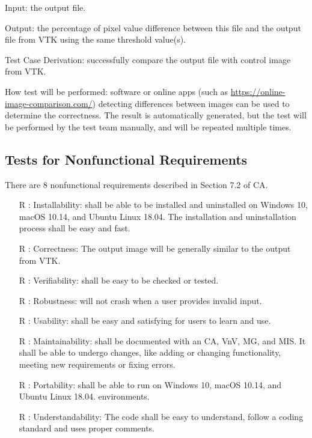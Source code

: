 \documentclass[12pt, titlepage]{article}
\begin{document}
\begin{enumerate}
Input: the output file.
					
Output: the percentage of pixel value difference between this file and the
output file from VTK using the same threshold value(s).

Test Case Derivation: successfully compare the output file with control image
from VTK.

How test will be performed: software or online apps (such as
\url{https://online-image-comparison.com/}) detecting differences between images
can be used to determine the correctness. The result is automatically generated,
but the test will be performed by the test team manually, and will be repeated
multiple times.

\end{enumerate}

\subsection{Tests for Nonfunctional Requirements} \label{sec_nonfuncreqtest}

There are 8  nonfunctional requirements described in
Section 7.2 of CA.  

\begin{itemize}
\item[R\refstepcounter{reqnum}\thereqnum
\label{R_install}:] Installability: \famname{} shall be able to be installed and
uninstalled on Windows 10, macOS 10.14, and Ubuntu Linux 18.04. The installation
and uninstallation process shall be easy and fast.
\item[R\refstepcounter{reqnum}\thereqnum
\label{R_correct}:] Correctness: The output image will be generally similar to
the output from VTK.
\item[R\refstepcounter{reqnum}\thereqnum
\label{R_verify}:] Verifiability: \famname{} shall be easy to be checked or
tested.
\item[R\refstepcounter{reqnum}\thereqnum
\label{R_robust}:] Robustness: \famname{} will not crash when a user provides
invalid input.
\item[R\refstepcounter{reqnum}\thereqnum
\label{R_use}:] Usability: \famname{} shall be easy and satisfying for users to
learn and use.
\item[R\refstepcounter{reqnum}\thereqnum
\label{R_maintain}:] Maintainability: \famname{} shall be documented with an CA,
VnV, MG, and MIS. It shall be able to undergo changes, like adding or changing
functionality, meeting new requirements or fixing errors.
\item[R\refstepcounter{reqnum}\thereqnum
\label{R_portal}:] Portability: \famname{} shall be able to run on Windows 10,
macOS 10.14, and Ubuntu Linux 18.04. environments.
\item[R\refstepcounter{reqnum}\thereqnum
\label{R_understand}:] Understandability: The code shall be easy to understand,
follow a coding standard and uses proper comments.
\end{itemize}
\end{document}

